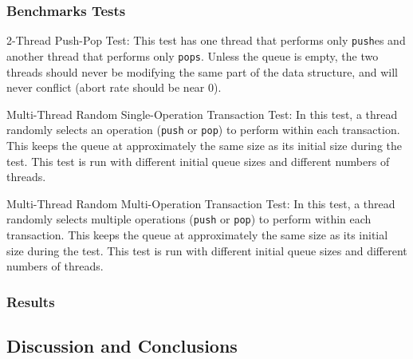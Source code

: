 \subsubsection{Benchmarks Tests}
\begin{ordlist}
\item 2-Thread Push-Pop Test: This test has one thread that performs only \texttt{push}es and another thread that performs only \texttt{pops}. Unless the queue is empty, the two threads should never be modifying the same part of the data structure, and will never conflict (abort rate should be near 0).

\item Multi-Thread Random Single-Operation Transaction Test: 
    In this test, a thread randomly selects an operation (\texttt{push} or \texttt{pop}) to perform within each transaction. This keeps the queue at approximately the same size as its initial size during the test. This test is run with different initial queue sizes and different numbers of threads.
    
\item Multi-Thread Random Multi-Operation Transaction Test: 
    In this test, a thread randomly selects multiple operations (\texttt{push} or \texttt{pop}) to perform within each transaction. This keeps the queue at approximately the same size as its initial size during the test. This test is run with different initial queue sizes and different numbers of threads.
    
\end{ordlist}

\subsubsection{Results}

\subsection{Discussion and Conclusions}

